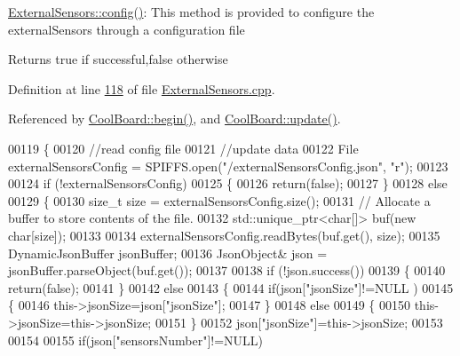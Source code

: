 \hyperlink{class_external_sensors_a862a4bd11346b37270d0244c2adabe5a}{External\+Sensors\+::config()}\+: This method is provided to configure the external\+Sensors through a configuration file

\begin{DoxyReturn}{Returns}
true if successful,false otherwise 
\end{DoxyReturn}


Definition at line \hyperlink{_external_sensors_8cpp_source_l00118}{118} of file \hyperlink{_external_sensors_8cpp_source}{External\+Sensors.\+cpp}.



Referenced by \hyperlink{_cool_board_8cpp_source_l00021}{Cool\+Board\+::begin()}, and \hyperlink{_cool_board_8cpp_source_l00411}{Cool\+Board\+::update()}.


\begin{DoxyCode}
00119 \{
00120     \textcolor{comment}{//read config file}
00121     \textcolor{comment}{//update data}
00122     File externalSensorsConfig = SPIFFS.open(\textcolor{stringliteral}{"/externalSensorsConfig.json"}, \textcolor{stringliteral}{"r"});
00123 
00124     \textcolor{keywordflow}{if} (!externalSensorsConfig) 
00125     \{
00126         \textcolor{keywordflow}{return}(\textcolor{keyword}{false});
00127     \}
00128     \textcolor{keywordflow}{else}
00129     \{
00130         \textcolor{keywordtype}{size\_t} size = externalSensorsConfig.size();
00131         \textcolor{comment}{// Allocate a buffer to store contents of the file.}
00132         std::unique\_ptr<char[]> buf(\textcolor{keyword}{new} \textcolor{keywordtype}{char}[size]);
00133 
00134         externalSensorsConfig.readBytes(buf.get(), size);
00135         DynamicJsonBuffer jsonBuffer;
00136         JsonObject& json = jsonBuffer.parseObject(buf.get());
00137 
00138         \textcolor{keywordflow}{if} (!json.success()) 
00139         \{
00140               \textcolor{keywordflow}{return}(\textcolor{keyword}{false});
00141         \} 
00142         \textcolor{keywordflow}{else}
00143         \{   
00144             \textcolor{keywordflow}{if}(json[\textcolor{stringliteral}{"jsonSize"}]!=NULL )
00145             \{           
00146                 this->jsonSize=json[\textcolor{stringliteral}{"jsonSize"}];
00147             \}
00148             \textcolor{keywordflow}{else}
00149             \{
00150                 this->jsonSize=this->jsonSize;
00151             \}
00152             json[\textcolor{stringliteral}{"jsonSize"}]=this->jsonSize;            
00153 
00154             
00155             \textcolor{keywordflow}{if}(json[\textcolor{stringliteral}{"sensorsNumber"}]!=NULL)

\end{DoxyCode}
